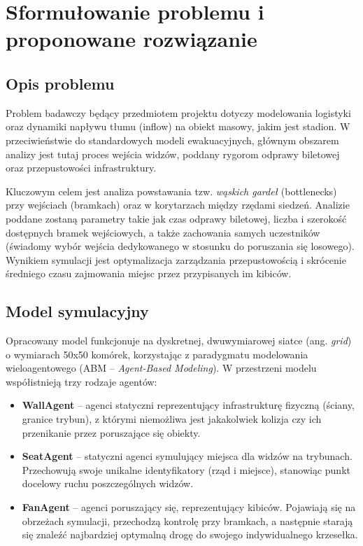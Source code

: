 \documentclass[polish]{projectreport}
\begin{document}
\section{Sformułowanie problemu i proponowane rozwiązanie}
\label{sec:problem_formulation}

\subsection{Opis problemu}
Problem badawczy będący przedmiotem projektu dotyczy modelowania logistyki oraz dynamiki napływu tłumu (inflow) na obiekt masowy, jakim jest stadion. W przeciwieństwie do standardowych modeli ewakuacyjnych, głównym obszarem analizy jest tutaj proces wejścia widzów, poddany rygorom odprawy biletowej oraz przepustowości infrastruktury.

Kluczowym celem jest analiza powstawania tzw. \textit{wąskich gardeł} (bottlenecks) przy wejściach (bramkach) oraz w korytarzach między rzędami siedzeń. Analizie poddane zostaną parametry takie jak czas odprawy biletowej, liczba i szerokość dostępnych bramek wejściowych, a także zachowania samych uczestników (świadomy wybór wejścia dedykowanego w stosunku do poruszania się losowego). Wynikiem symulacji jest optymalizacja zarządzania przepustowością i skrócenie średniego czasu zajmowania miejsc przez przypisanych im kibiców.

\subsection{Model symulacyjny}
Opracowany model funkcjonuje na dyskretnej, dwuwymiarowej siatce (ang. \textit{grid}) o wymiarach 50x50 komórek, korzystając z paradygmatu modelowania wieloagentowego (ABM -- \textit{Agent-Based Modeling}). W przestrzeni modelu współistnieją trzy rodzaje agentów:
\begin{itemize}
    \item \textbf{WallAgent} -- agenci statyczni reprezentujący infrastrukturę fizyczną (ściany, granice trybun), z którymi niemożliwa jest jakakolwiek kolizja czy ich przenikanie przez poruszające się obiekty.
    \item \textbf{SeatAgent} -- statyczni agenci symulujący miejsca dla widzów na trybunach. Przechowują swoje unikalne identyfikatory (rząd i miejsce), stanowiąc punkt docelowy ruchu poszczególnych widzów.
    \item \textbf{FanAgent} -- agenci poruszający się, reprezentujący kibiców. Pojawiają się na obrzeżach symulacji, przechodzą kontrolę przy bramkach, a następnie starają się znaleźć najbardziej optymalną drogę do swojego indywidualnego krzesełka.
\end{itemize}
\end{document}
